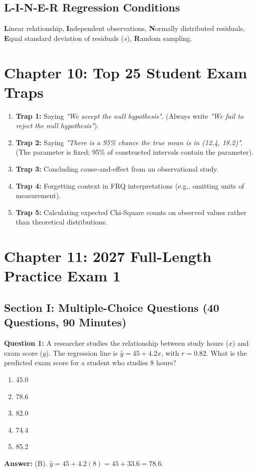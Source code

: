 ﻿\documentclass[11pt,oneside,openany]{book}
\begin{document}
\section{L-I-N-E-R Regression Conditions}
\textbf{L}inear relationship, \textbf{I}ndependent observations, \textbf{N}ormally distributed residuals, \textbf{E}qual standard deviation of residuals ($s$), \textbf{R}andom sampling.

\chapter{Chapter 10: Top 25 Student Exam Traps}
\begin{enumerate}[leftmargin=1.5em]
  \item \textbf{Trap 1:} Saying \textit{"We accept the null hypothesis"}. (Always write \textit{"We fail to reject the null hypothesis"}).
  \item \textbf{Trap 2:} Saying \textit{"There is a 95\% chance the true mean is in (12.4, 18.2)"}. (The parameter is fixed; 95\% of constructed intervals contain the parameter).
  \item \textbf{Trap 3:} Concluding cause-and-effect from an observational study.
  \item \textbf{Trap 4:} Forgetting context in FRQ interpretations (e.g., omitting units of measurement).
  \item \textbf{Trap 5:} Calculating expected Chi-Square counts on observed values rather than theoretical distributions.
\end{enumerate}

\chapter{Chapter 11: 2027 Full-Length Practice Exam 1}
\section*{Section I: Multiple-Choice Questions (40 Questions, 90 Minutes)}
\textbf{Question 1:} A researcher studies the relationship between study hours ($x$) and exam score ($y$). The regression line is $\hat{y} = 45 + 4.2x$, with $r = 0.82$. What is the predicted exam score for a student who studies 8 hours?
\begin{enumerate}[label=(\Alph*)]
  \item 45.0
  \item 78.6
  \item 82.0
  \item 74.4
  \item 85.2
\end{enumerate}
\textbf{Answer:} (B). $\hat{y} = 45 + 4.2(8) = 45 + 33.6 = 78.6$.
\end{document}
